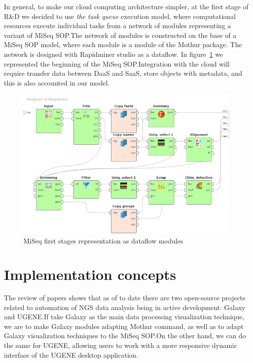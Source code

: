 \documentclass[a4paper]{jpconf}
\begin{document}
In general, to make our cloud computing architecture simpler, at the first stage of R\&D we decided to use \emph{the task queue} execution model, where computational resources execute individual tasks from a network of modules representing a variant of MiSeq SOP.\@  The network of modules is constructed on the base of a MiSeq SOP model, where each module is a module of the Mothur package.  The network is designed with Rapidminer studio as a dataflow.  In figure~\ref{fig:mothur} we represented the beginning of the MiSeq SOP.\@  Integration with the cloud will require transfer data between DaaS and SaaS, store objects with metadata, and this is also accounted in our model.



\begin{figure}[bt]
  \centering
   \includegraphics[width=0.9\linewidth]{Dataflow-color-en.png}
  \caption{MiSeq first stages representation as dataflow modules~\cite{cherk19}}\label{fig:mothur}
\end{figure}


\section{Implementation concepts}

The review of papers shows that as of to date there are two open-source projects related to automation of NGS data analysis being in active development: Galaxy and UGENE.\@  If take Galaxy as the main data processing visualization technique, we are to make Galaxy modules adapting Mothur command, as well as to adapt Galaxy visualization techniques to the MiSeq SOP.\@  On the other hand, we can do the same for UGENE, allowing users to work with a more responsive dynamic interface of the UGENE desktop application.
\end{document}
